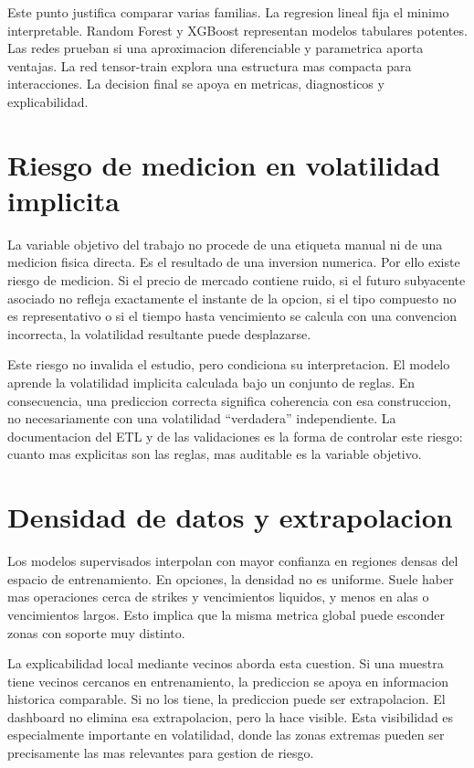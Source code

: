 Este punto justifica comparar varias familias. La regresion lineal fija el minimo interpretable. Random Forest y XGBoost representan modelos tabulares potentes. Las redes prueban si una aproximacion diferenciable y parametrica aporta ventajas. La red tensor-train explora una estructura mas compacta para interacciones. La decision final se apoya en metricas, diagnosticos y explicabilidad.

\section{Riesgo de medicion en volatilidad implicita}

La variable objetivo del trabajo no procede de una etiqueta manual ni de una medicion fisica directa. Es el resultado de una inversion numerica. Por ello existe riesgo de medicion. Si el precio de mercado contiene ruido, si el futuro subyacente asociado no refleja exactamente el instante de la opcion, si el tipo compuesto no es representativo o si el tiempo hasta vencimiento se calcula con una convencion incorrecta, la volatilidad resultante puede desplazarse.

Este riesgo no invalida el estudio, pero condiciona su interpretacion. El modelo aprende la volatilidad implicita calculada bajo un conjunto de reglas. En consecuencia, una prediccion correcta significa coherencia con esa construccion, no necesariamente con una volatilidad ``verdadera'' independiente. La documentacion del ETL y de las validaciones es la forma de controlar este riesgo: cuanto mas explicitas son las reglas, mas auditable es la variable objetivo.

\section{Densidad de datos y extrapolacion}

Los modelos supervisados interpolan con mayor confianza en regiones densas del espacio de entrenamiento. En opciones, la densidad no es uniforme. Suele haber mas operaciones cerca de strikes y vencimientos liquidos, y menos en alas o vencimientos largos. Esto implica que la misma metrica global puede esconder zonas con soporte muy distinto.

La explicabilidad local mediante vecinos aborda esta cuestion. Si una muestra tiene vecinos cercanos en entrenamiento, la prediccion se apoya en informacion historica comparable. Si no los tiene, la prediccion puede ser extrapolacion. El dashboard no elimina esa extrapolacion, pero la hace visible. Esta visibilidad es especialmente importante en volatilidad, donde las zonas extremas pueden ser precisamente las mas relevantes para gestion de riesgo.
